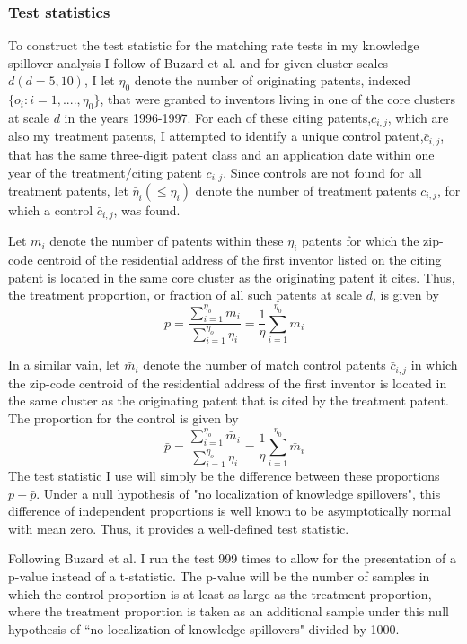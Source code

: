\documentclass[12pt,letterpaper]{article}
\begin{document}
\subsubsection{Test statistics}
To construct the test statistic for the matching rate tests in my knowledge spillover analysis I follow of Buzard et al. and for given cluster scales \(d(d=5,10)\), I let \(\eta_0\) denote the number of originating patents, indexed \(\{o_i:i=1,....,\eta_0\}\), that were granted to inventors living in one of the core clusters at scale \(d\) in the years 1996-1997. For each of these citing patents,\(c_{i,j}\), which are also my treatment patents, I attempted to identify a unique control patent,\(\bar{c}_{i,j}\), that has the same three-digit patent class and an application date within one year of the treatment/citing patent \(c_{i,j}\). Since controls are not found for all treatment patents, let \(\bar{\eta}_i(\leq\eta_i)\) denote the number of treatment patents \(c_{i,j}\), for which a control \(\bar{c}_{i,j}\), was found.
\par 
Let \(m_i\) denote the number of patents within these \(\bar{\eta}_i\) patents for which the zip-code centroid of the residential address of the first inventor listed on the citing patent is located in the same core cluster as the originating patent it cites. Thus, the treatment proportion, or fraction of all such patents at scale \(d\), is given by
\begin{equation}
    p = \frac{\sum_{i=1}^{\eta_o}m_i}{\sum_{i=1}^{\eta_o}\eta_i} = \frac{1}{\eta}\sum_{i=1}^{\eta_0} m_i
\end{equation}
\par 
In a similar vain, let \(\bar{m}_i\) denote the number of match control patents \(\bar{c}_{i,j}\) in which the zip-code centroid of the residential address of the first inventor is located in the same cluster as the originating patent that is cited by the treatment patent. The proportion for the control is given by
\begin{equation}
    \bar{p} = \frac{\sum_{i=1}^{\eta_o}\bar{m}_i}{\sum_{i=1}^{\eta_o}\eta_i} = \frac{1}{\eta}\sum_{i=1}^{\eta_0} \bar{m}_i
\end{equation}
The test statistic I use will simply be the difference between these proportions \(p-\bar{p}\). Under a null hypothesis of "no localization of knowledge spillovers", this difference of independent proportions is well known to be asymptotically normal with mean zero. Thus, it provides a well-defined test statistic. 
\par 
Following Buzard et al. I run the test 999 times to allow for the presentation of a p-value instead of a t-statistic. The p-value will be the number of samples in which the control proportion is at least as large as the treatment proportion, where the treatment proportion is taken as an additional sample under this null hypothesis of ``no localization of knowledge spillovers" divided by 1000. 
\end{document}
